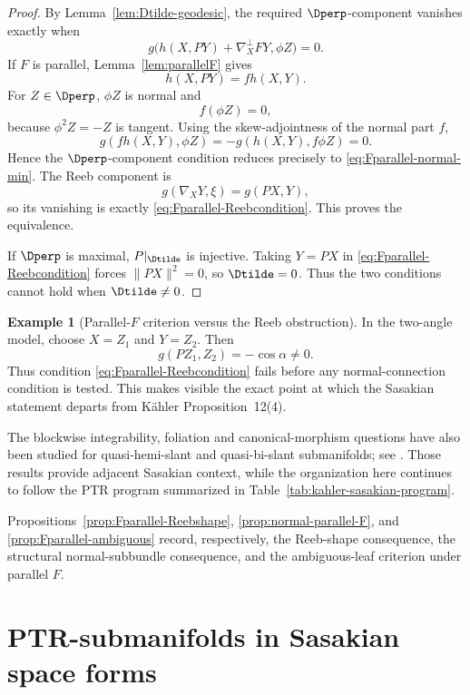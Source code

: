 \documentclass[11pt]{article}
\theoremstyle{definition}\newtheorem{definition}[theorem]{Definition}\newtheorem{example}[theorem]{Example}
\theoremstyle{remark}\newtheorem{remark}[theorem]{Remark}
\begin{document}
\begin{proof}
By Lemma~\ref{lem:Dtilde-geodesic}, the required
\(\Dperp\)-component vanishes exactly when
\[
 g\bigl(h(X,PY)+\nabla_X^\perp FY,\phi Z\bigr)=0.
\]
If \(F\) is parallel, Lemma~\ref{lem:parallelF} gives
\[
 h(X,PY)=f h(X,Y).
\]
For \(Z\in\Dperp\), \(\phi Z\) is normal and
\[
 f(\phi Z)=0,
\]
because \(\phi^2Z=-Z\) is tangent.  Using the skew-adjointness of the
normal part \(f\),
\[
 g(fh(X,Y),\phi Z)
 =
 -g(h(X,Y),f\phi Z)=0.
\]
Hence the \(\Dperp\)-component condition reduces precisely to
\eqref{eq:Fparallel-normal-min}.  The Reeb component is
\[
 g(\nabla_XY,\xi)=g(PX,Y),
\]
so its vanishing is exactly
\eqref{eq:Fparallel-Reebcondition}.  This proves the equivalence.

If \(\Dperp\) is maximal, \(P|_{\Dtilde}\) is injective.  Taking
\(Y=PX\) in \eqref{eq:Fparallel-Reebcondition} forces
\(\|PX\|^2=0\), so \(\Dtilde=0\).  Thus the two conditions cannot hold
when \(\Dtilde\ne0\).
\end{proof}

\begin{example}[Parallel-$F$ criterion versus the Reeb obstruction]\label{ex:Fparallel-ambiguous}
In the two-angle model, choose $X=Z_1$ and $Y=Z_2$.  Then
\[
 g(PZ_1,Z_2)=-\cos\alpha\neq0.
\]
Thus condition \eqref{eq:Fparallel-Reebcondition} fails before any normal-connection condition is tested.  This makes visible the exact point at which the Sasakian statement departs from K\"ahler Proposition~12(4).
\end{example}



The blockwise integrability, foliation and canonical-morphism questions
have also been studied for quasi-hemi-slant and quasi-bi-slant
submanifolds; see \cite{PrasadVermaKumar2020,PrasadVerma2021}.  Those
results provide adjacent Sasakian context, while the organization here
continues to follow the PTR program summarized in
Table~\ref{tab:kahler-sasakian-program}.


Propositions~\ref{prop:Fparallel-Reebshape},
\ref{prop:normal-parallel-F}, and \ref{prop:Fparallel-ambiguous} record,
respectively, the Reeb-shape consequence, the structural normal-subbundle
consequence, and the ambiguous-leaf criterion under parallel \(F\).

\section{PTR-submanifolds in Sasakian space forms}\label{sec:spaceform}
\end{document}

